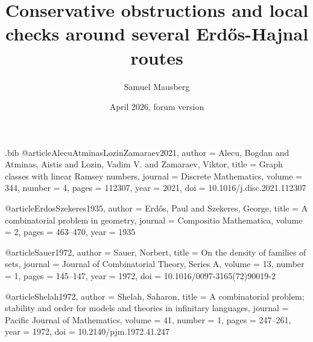\begin{filecontents*}{\jobname.bib}
@article{AlecuAtminasLozinZamaraev2021,
  author  = {Alecu, Bogdan and Atminas, Aistis and Lozin, Vadim V. and Zamaraev, Viktor},
  title   = {Graph classes with linear {Ramsey} numbers},
  journal = {Discrete Mathematics},
  volume  = {344},
  number  = {4},
  pages   = {112307},
  year    = {2021},
  doi     = {10.1016/j.disc.2021.112307}
}

@article{ErdosSzekeres1935,
  author  = {Erd\H{o}s, Paul and Szekeres, George},
  title   = {A combinatorial problem in geometry},
  journal = {Compositio Mathematica},
  volume  = {2},
  pages   = {463--470},
  year    = {1935}
}

@article{Sauer1972,
  author  = {Sauer, Norbert},
  title   = {On the density of families of sets},
  journal = {Journal of Combinatorial Theory, Series A},
  volume  = {13},
  number  = {1},
  pages   = {145--147},
  year    = {1972},
  doi     = {10.1016/0097-3165(72)90019-2}
}

@article{Shelah1972,
  author  = {Shelah, Saharon},
  title   = {A combinatorial problem; stability and order for models and theories in infinitary languages},
  journal = {Pacific Journal of Mathematics},
  volume  = {41},
  number  = {1},
  pages   = {247--261},
  year    = {1972},
  doi     = {10.2140/pjm.1972.41.247}
}
\end{filecontents*}

\documentclass[11pt]{amsart}
\usepackage[T1]{fontenc}
\usepackage[utf8]{inputenc}
\usepackage{lmodern}
\usepackage{microtype}
\usepackage[margin=0.82in]{geometry}
\usepackage{amsmath,amssymb,amsthm,mathtools}
\usepackage{enumitem}
\usepackage[hidelinks]{hyperref}
\usepackage[nameinlink,noabbrev]{cleveref}
\usepackage[backend=biber,style=alphabetic,maxbibnames=99,giveninits=true]{biblatex}

\setlength{\emergencystretch}{4em}
\setlength{\parskip}{0.08em}
\linespread{1.02}

\newtheorem{theorem}{Theorem}[section]
\newtheorem{proposition}[theorem]{Proposition}
\newtheorem{lemma}[theorem]{Lemma}
\newtheorem{corollary}[theorem]{Corollary}
\theoremstyle{definition}
\newtheorem{definition}[theorem]{Definition}
\newtheorem{question}[theorem]{Question}
\theoremstyle{remark}
\newtheorem{remark}[theorem]{Remark}

\newcommand{\F}{\mathbb F}
\newcommand{\VCdim}{\operatorname{VCdim}}
\DeclareMathOperator{\im}{im}

\title[Conservative obstructions toward EH]{Conservative obstructions and local checks around several Erd\H{o}s-Hajnal routes}
\author{Samuel Mausberg}
\date{April 2026, forum version}


